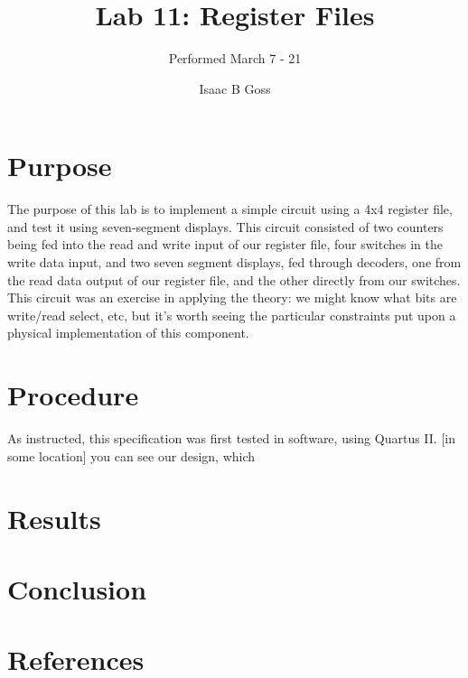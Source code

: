 \documentclass[titlepage]{article}
\author{Isaac B Goss}
\title{Lab 11: Register Files}
\subtitle{Performed March 7 - 21}
\begin{document}
    \maketitle
    \section{Purpose}
        The purpose of this lab is to implement a simple circuit using a 4x4 register file, and test it using seven-segment displays.
        This circuit consisted of two counters being fed into the read and write input of our register file, four switches in the write data input, and two seven segment displays, fed through decoders, one from the read data output of our register file, and the other directly from our switches.
        This circuit was an exercise in applying the theory: we might know what bits are write/read select, etc, but it's worth seeing the particular constraints put upon a physical implementation of this component.
        
    \section{Procedure}
        As instructed, this specification was first tested in software, using Quartus II.
        [in some location] you can see our design, which 
        
    \section{Results}
        
    \section{Conclusion}
        
    \section{References}
        
    
\end{document}
